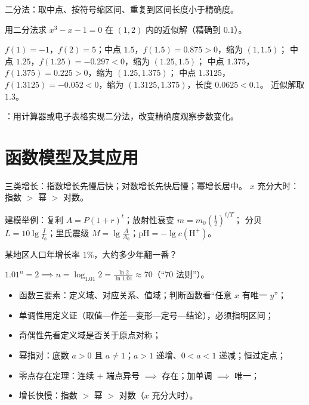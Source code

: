 \begin{procedure}
二分法：取中点、按符号缩区间、重复到区间长度小于精确度。

\begin{example}
用二分法求 $x^3-x-1=0$ 在 $(1,2)$ 内的近似解（精确到 $0.1$）。
\end{example}
\begin{solution}
$f(1)=-1$，$f(2)=5$；中点 $1.5$，$f(1.5)=0.875>0$，缩为 $(1,1.5)$；
中点 $1.25$，$f(1.25)=-0.297<0$，缩为 $(1.25,1.5)$；
中点 $1.375$，$f(1.375)=0.225>0$，缩为 $(1.25,1.375)$；
中点 $1.3125$，$f(1.3125)=-0.052<0$，缩为 $(1.3125,1.375)$，长度 $0.0625<0.1$。
近似解取 $1.3$。
\end{solution}

：用计算器或电子表格实现二分法，改变精确度观察步数变化。

\section{函数模型及其应用}
三类增长：指数增长先慢后快；对数增长先快后慢；幂增长居中。
$x$ 充分大时：指数 $>$ 幂 $>$ 对数。

建模举例：复利 $A=P(1+r)^t$；放射性衰变 $m=m_0\left(\frac12\right)^{t/T}$；
分贝 $L=10\lg\frac{I}{I_0}$；里氏震级 $M=\lg\frac{A}{A_0}$；$\mathrm{pH}=-\lg c(\mathrm{H}^+)$。

\begin{example}
某地区人口年增长率 $1\%$，大约多少年翻一番？
\end{example}
\begin{solution}
$1.01^n=2\implies n=\log_{1.01}2=\frac{\ln2}{\ln1.01}\approx70$（“70 法则”）。
\end{solution}

\end{procedure}

\begin{board}
\begin{itemize}
  \item 函数三要素：定义域、对应关系、值域；判断函数看“任意 $x$ 有唯一 $y$”；
  \item 单调性用定义证（取值—作差—变形—定号—结论），必须指明区间；
  \item 奇偶性先看定义域是否关于原点对称；
  \item 幂指对：底数 $a>0$ 且 $a\neq1$；$a>1$ 递增、$0<a<1$ 递减；恒过定点；
  \item 零点存在定理：连续 $+$ 端点异号 $\implies$ 存在；加单调 $\implies$ 唯一；
  \item 增长快慢：指数 $>$ 幂 $>$ 对数（$x$ 充分大时）。
\end{itemize}
\end{board}

